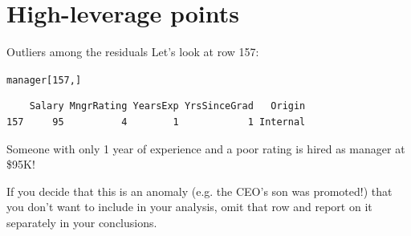 \documentclass{beamer}\usepackage[]{graphicx}\usepackage[]{color}
\makeatletter
\newcommand{\hlnum}[1]{\textcolor[rgb]{0.824,0.412,0.118}{#1}}%
\newcommand{\hlopt}[1]{\textcolor[rgb]{1,0.894,0.769}{#1}}%
\newcommand{\hlstd}[1]{\textcolor[rgb]{1,0.894,0.769}{#1}}%
\newcommand{\hlkwd}[1]{\textcolor[rgb]{1,0.78,0.769}{#1}}%
\newenvironment{kframe}{%
 \def\at@end@of@kframe{}%
 \ifinner\ifhmode%
  \def\at@end@of@kframe{\end{minipage}}%
  \begin{minipage}{\columnwidth}%
 \fi\fi%
 \def\FrameCommand##1{\hskip\@totalleftmargin \hskip-\fboxsep
 \colorbox{shadecolor}{##1}\hskip-\fboxsep
     \hskip-\linewidth \hskip-\@totalleftmargin \hskip\columnwidth}%
 \MakeFramed {\advance\hsize-\width
   \@totalleftmargin\z@ \linewidth\hsize
   \@setminipage}}%
 {\par\unskip\endMakeFramed%
 \at@end@of@kframe}
\newenvironment{knitrout}{}{} %
\makeatother
\begin{document}
\begin{darkframes}
\begin{frame}[fragile]
\begin{knitrout}
\end{knitrout}

\end{frame}
    
    \section{High-leverage points}
    
    
    
\begin{frame}[fragile]{Outliers among the residuals}  
      Let's look at row 157:
\begin{knitrout}
\begin{kframe}
\begin{alltt}
\hlstd{manager[}\hlnum{157}\hlstd{,]}
\end{alltt}
\begin{verbatim}
    Salary MngrRating YearsExp YrsSinceGrad   Origin
157     95          4        1            1 Internal
\end{verbatim}
\end{kframe}
\end{knitrout}
      Someone with only 1 year of experience and a poor rating is hired as manager at \$95K! \pause \bigskip
      
      If you decide that this is an anomaly (e.g. the CEO's son was promoted!) that you don't want to include in your analysis, omit that row and report on it separately in your conclusions.
\end{frame}
    

\end{darkframes}
\end{document}
